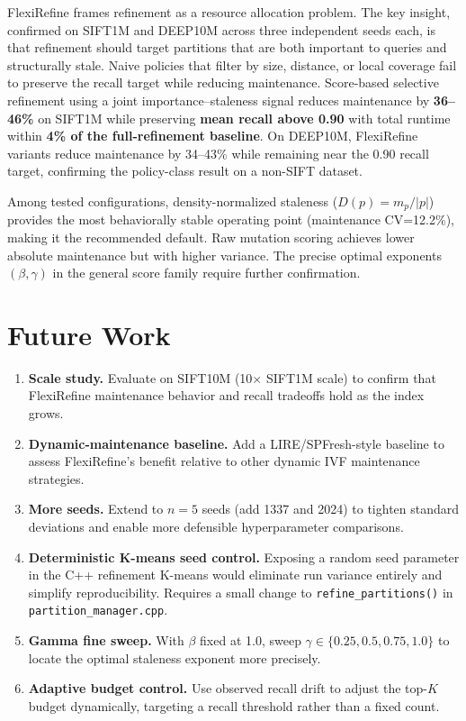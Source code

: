 \documentclass[sigconf, nonacm]{acmart}
\newcommand{\system}{FlexiRefine\xspace}
\begin{document}
\system frames refinement as a resource allocation problem. The key
insight, confirmed on SIFT1M and DEEP10M across three independent
seeds each, is that refinement should target partitions that are both
important to queries and structurally stale. Naive policies that
filter by size, distance, or local coverage fail to preserve the
recall target while reducing maintenance. Score-based selective
refinement using a joint importance--staleness signal reduces
maintenance by \textbf{36--46\%} on SIFT1M while preserving
\textbf{mean recall above 0.90} with total runtime within
\textbf{4\% of the full-refinement baseline}. On DEEP10M,
FlexiRefine variants reduce maintenance by 34--43\% while remaining
near the 0.90 recall target, confirming the policy-class result on a
non-SIFT dataset.

Among tested configurations, density-normalized staleness
($D(p) = m_p / |p|$) provides the most behaviorally stable operating
point (maintenance CV=12.2\%), making it the recommended default.
Raw mutation scoring achieves lower absolute maintenance but with
higher variance. The precise optimal exponents $(\beta, \gamma)$ in
the general score family require further confirmation.

\section{Future Work}
\label{sec:future}

\begin{enumerate}[leftmargin=*]
  \item \textbf{Scale study.}
    Evaluate on SIFT10M (10$\times$ SIFT1M scale) to confirm that
    FlexiRefine maintenance behavior and recall tradeoffs hold as
    the index grows.

  \item \textbf{Dynamic-maintenance baseline.}
    Add a LIRE/SPFresh-style baseline to assess FlexiRefine's benefit
    relative to other dynamic IVF maintenance strategies.

  \item \textbf{More seeds.}
    Extend to $n=5$ seeds (add 1337 and 2024) to tighten standard
    deviations and enable more defensible hyperparameter comparisons.

  \item \textbf{Deterministic K-means seed control.}
    Exposing a random seed parameter in the C++ refinement K-means
    would eliminate run variance entirely and simplify reproducibility.
    Requires a small change to \texttt{refine\_partitions()} in
    \texttt{partition\_manager.cpp}.

  \item \textbf{Gamma fine sweep.}
    With $\beta$ fixed at 1.0, sweep $\gamma \in \{0.25, 0.5, 0.75,
    1.0\}$ to locate the optimal staleness exponent more precisely.

  \item \textbf{Adaptive budget control.}
    Use observed recall drift to adjust the top-$K$ budget
    dynamically, targeting a recall threshold rather than a fixed count.
\end{enumerate}



\end{document}
